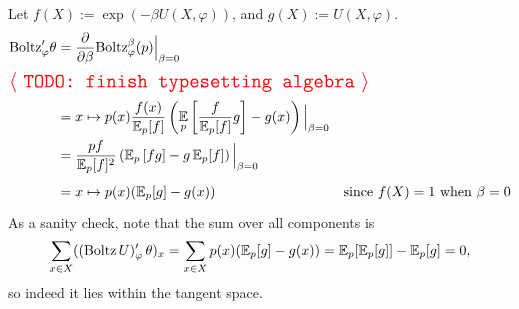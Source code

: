 \begin{subappendices}
    \begin{lproof}\label{proof:bolz-fields}
    	Let $f(X) := \exp(-\beta U(X,\varphi))$, and $g(X) := U(X,\varphi)$.
    	\begin{align*}
    		\mathrm{Boltz}'_\varphi\theta &= \frac{\partial}{\partial \beta} \mathrm{Boltz}^\beta_\varphi(p) \Big|_{\beta=0} \\
    	\intertext{\TODO[TODO: finish typesetting algebra]}
    		&= x \mapsto
    			p(x) \frac{f(x)}{\Ex_p[f]}
    				\left(\Ex_p\left[ \frac{f}{\Ex_{p}[f]} g\right] - g(x) \right)
    				\Big|_{\beta=0}
    				\\
    		&= \frac{pf}{\Ex_p[f]^2}
    			\left(\Ex\nolimits_p\left[ f g\right] - g \Ex\nolimits_{p}[f] \right)
    			\Big|_{\beta=0} \\
    		&= x \mapsto p(x) (\Ex\nolimits_p[g] - g(x)) &
    			\text{since $f(X) = 1$ when $\beta=0$}
    	\end{align*}
    	As a sanity check, note that the sum over all components is
    	\[ \sum_{x \in X} ((\mathrm{Boltz}\,U)'_\varphi\, \theta)_x
    		 = \sum_{x \in X} p(x) (\operatorname*{\mathbb{E}}\nolimits_p[g] - g(x))
    		 = \operatorname*{\mathbb{E}}\nolimits_p[ \operatorname*{\mathbb{E}}\nolimits_p [ g ]] - \operatorname*{\mathbb{E}}\nolimits_p [g] = 0,
    	 \]
    	 so indeed it lies within the tangent space.
    \end{lproof}
\end{subappendices}
